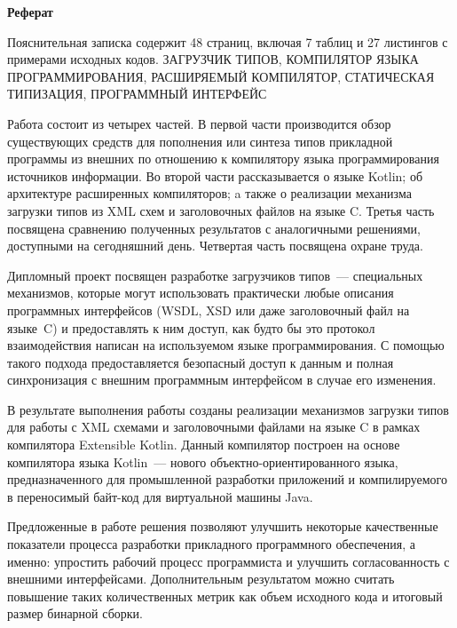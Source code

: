 \documentclass[a4paper,12pt]{article}
\newcommand{\ssection}[1]{\section*{#1}{\centering #1}}
\begin{document}
\begin{center}
\Large\bfseries
Реферат
\end{center}

Пояснительная записка содержит 48 страниц, включая 7 таблиц и 27 листингов с примерами исходных кодов.
\newline\newline
ЗАГРУЗЧИК ТИПОВ, КОМПИЛЯТОР ЯЗЫКА ПРОГРАММИРОВАНИЯ, РАСШИРЯЕМЫЙ КОМПИЛЯТОР, СТАТИЧЕСКАЯ ТИПИЗАЦИЯ, ПРОГРАММНЫЙ ИНТЕРФЕЙС
\newline

Работа состоит из четырех частей. В первой части производится обзор существующих средств для пополнения или синтеза типов прикладной программы из внешних по отношению к компилятору языка программирования источников информации. Во второй части рассказывается о языке Kotlin; об архитектуре расширенных компиляторов; a также о реализации механизма загрузки типов из XML схем и заголовочных файлов на языке C. Третья часть посвящена сравнению полученных результатов с аналогичными решениями, доступными на сегодняшний день. Четвертая часть посвящена охране труда.

Дипломный проект посвящен разработке загрузчиков типов~---
специальных механизмов, которые могут использовать практически любые описания программных интерфейсов (WSDL, XSD или даже заголовочный файл на языке~C) и предоставлять к ним доступ, как будто бы это протокол взаимодействия написан на используемом языке программирования. С помощью такого подхода предоставляется безопасный доступ к данным и полная синхронизация с внешним программным интерфейсом в случае его изменения.

В результате выполнения работы созданы реализации механизмов загрузки типов для работы с XML схемами и заголовочными файлами на языке C в рамках компилятора Extensible Kotlin.
Данный компилятор построен на основе компилятора языка Kotlin~--- нового объектно-ориентированного языка, предназначенного для промышленной разработки приложений и компилируемого в переносимый байт-код для виртуальной машины Java.

Предложенные в работе решения позволяют улучшить некоторые качественные показатели процесса разработки прикладного программного обеспечения, а именно: упростить рабочий процесс программиста и улучшить согласованность с внешними интерфейсами. Дополнительным результатом можно считать повышение таких количественных метрик как объем исходного кода и итоговый размер бинарной сборки.
\end{document}
